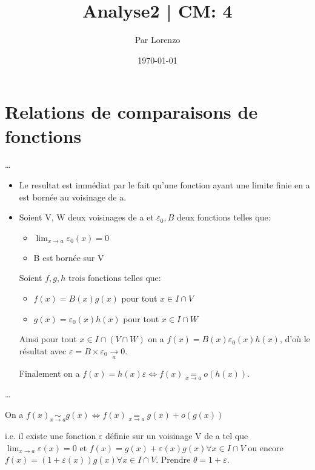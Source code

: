 \documentclass[a4paper, 12pt]{article}
\title{Analyse2 | CM: 4}
\author{Par Lorenzo}
\date{\today}
\begin{document}
\maketitle

\section{Relations de comparaisons de fonctions}

\dots

\begin{demonstration}
    \begin{itemize}
        \item Le resultat est immédiat par le fait qu'une fonction ayant une limite finie en a est bornée au voisinage de a.
        \item Soient V, W deux voisinages de a et $\varepsilon_0, B$ deux fonctions telles que:
        \begin{itemize}
            \item $\lim_{x \to a}\varepsilon_0(x) = 0$
            \item B est bornée sur V
        \end{itemize}
        Soient $f, g, h$ trois fonctions telles que:
        \begin{itemize}
            \item $f(x) = B(x)g(x)$ pour tout $x \in I \cap V$
            \item $g(x) = \varepsilon_0(x)h(x)$ pour tout $x \in I \cap W$
        \end{itemize}

        Ainsi pour tout $x \in I \cap (V \cap W)$ on a $f(x) = B(x)\varepsilon_0(x)h(x)$, d'où le résultat avec $\varepsilon = B \times \varepsilon_0 \underset{a}{\rightarrow} 0$.

        Finalement on a $f(x) = h(x)\varepsilon \iff f(x) \underset{x \to a}{=} o(h(x))$.
    \end{itemize}
\end{demonstration}

\dots

\begin{demonstration}
    On a $f(x) \underset{x \to a}{\sim} g(x) \iff f(x) \underset{x \to a}{=} g(x) + o(g(x))$

    i.e. il existe une fonction $\varepsilon$ définie sur un voisinage V de a tel que $\lim_{x \to a}\varepsilon(x) = 0$ et $f(x) = g(x) + \varepsilon(x)g(x) \forall x \in I \cap V$ ou encore $f(x) = (1 + \varepsilon(x))g(x) \forall x \in I \cap V$. Prendre $\theta = 1 + \varepsilon$.
\end{demonstration}
\end{document}
